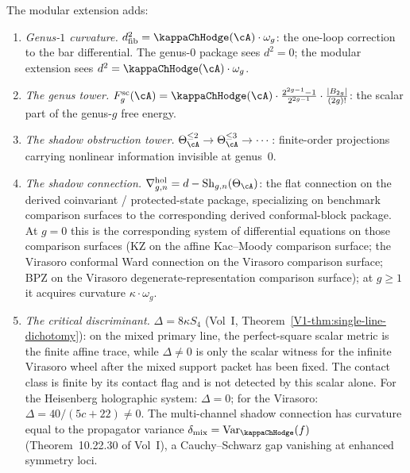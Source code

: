 \begin{construction}
The modular extension adds:
\begin{enumerate}[label=\textup{(\roman*)}]
\item \emph{Genus-$1$ curvature.}
 $d_{\mathrm{fib}}^2=\kappaChHodge(\cA)\cdot\omega_g$: the
 one-loop correction to the bar differential. The genus-$0$
 package sees $d^2=0$; the modular extension sees
 $d^2=\kappaChHodge(\cA)\cdot\omega_g$.
\item \emph{The genus tower.}
 $F_g^{\mathrm{sc}}(\cA)=\kappaChHodge(\cA)\cdot
 \tfrac{2^{2g-1}-1}{2^{2g-1}}\cdot\tfrac{|B_{2g}|}{(2g)!}$: the scalar
 part of the genus-$g$ free energy.
\item \emph{The shadow obstruction tower.}
 $\Theta_\cA^{\le 2}\to\Theta_\cA^{\le 3}\to\cdots$:
 finite-order projections carrying nonlinear
 information invisible at genus~$0$.
\item \emph{The shadow connection.}
 $\nabla^{\mathrm{hol}}_{g,n}=d-\mathrm{Sh}_{g,n}(\Theta_\cA)$:
 the flat connection on the derived coinvariant /
 protected-state package, specializing on benchmark
 comparison surfaces to the corresponding derived
 conformal-block package. At
 $g=0$ this is the corresponding system of differential equations
 on those comparison surfaces (KZ on the affine Kac--Moody
 comparison surface; the Virasoro conformal Ward connection on the
 Virasoro comparison surface; BPZ on the Virasoro
 degenerate-representation comparison surface);
 at $g\ge 1$ it acquires curvature $\kappa\cdot\omega_g$.
\item \emph{The critical discriminant.}
 $\Delta=8\kappa S_4$
 (Vol~I, Theorem~\ref*{V1-thm:single-line-dichotomy}):
 on the mixed primary line, the perfect-square scalar metric is the
 finite affine trace, while \(\Delta\neq0\) is only the scalar witness
 for the infinite Virasoro wheel after the mixed support packet has
 been fixed.  The contact class is finite by its contact flag and is
 not detected by this scalar alone.
 For the Heisenberg holographic system:
 $\Delta=0$; for the Virasoro:
 $\Delta=40/(5c{+}22)\neq 0$.
 The multi-channel shadow connection has curvature equal to the propagator variance $\delta_{\mathrm{mix}} = \operatorname{Var}_\kappaChHodge(f)$ (Theorem~10.22.30 of Vol~I), a Cauchy--Schwarz gap vanishing at enhanced symmetry loci.
\end{enumerate}
\end{construction}

